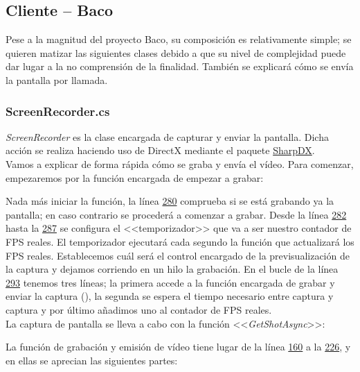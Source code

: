 \documentclass[12pt, a4paper]{book} %
\begin{document}
			\subsection{Cliente -- Baco}
			Pese a la magnitud del proyecto Baco, su composición es relativamente simple; se quieren matizar las siguientes clases debido a que su nivel de complejidad puede dar lugar a la no comprensión de la finalidad. También se explicará cómo se envía la pantalla por llamada.
				\subsubsection{ScreenRecorder.cs}
				\textit{ScreenRecorder} es la clase encargada de capturar y enviar la pantalla. Dicha acción se realiza haciendo uso de DirectX mediante el paquete \hyperlink{sharpdx}{SharpDX}.\\
				Vamos a explicar de forma rápida cómo se graba y envía el vídeo. Para comenzar, empezaremos por la función encargada de empezar a grabar:
				
				Nada más iniciar la función, la línea \hyperlink{../Baco/Recorder/ScreenRecorder.cs280}{280} comprueba si se está grabando ya la pantalla; en caso contrario se procederá a comenzar a grabar. Desde la línea \hyperlink{../Baco/Recorder/ScreenRecorder.cs282}{282} hasta la \hyperlink{../Baco/Recorder/ScreenRecorder.cs287}{287} se configura el <<temporizador>> que va a ser nuestro contador de FPS reales. El temporizador ejecutará cada segundo la función que actualizará los FPS reales. Establecemos cuál será el control encargado de la previsualización de la captura y dejamos corriendo en un hilo la grabación. En el bucle de la línea \hyperlink{../Baco/Recorder/ScreenRecorder.cs293}{293} tenemos tres líneas; la primera accede a la función encargada de grabar y enviar la captura (), la segunda se espera el tiempo necesario entre captura y captura y por último añadimos uno al contador de FPS reales.\\
				La captura de pantalla se lleva a cabo con la función <<\textit{GetShotAsync}>>:
				
				La función de grabación y emisión de vídeo tiene lugar de la línea \hyperlink{../Baco/Recorder/ScreenRecorder.cs160}{160} a la \hyperlink{../Baco/Recorder/ScreenRecorder.cs226}{226}, y en ellas se aprecian las siguientes partes:
\end{document}

